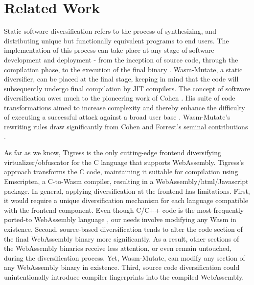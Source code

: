 \documentclass[a4paper,fleqn]{cas-dc}
\newcommand*\badge[1]{ \colorbox{red}{\color{white}#1}}
\newcommand{\tool}{{\sc Wasm-Mutate}\xspace}
\newcommand{\Wasm}{WebAssembly\xspace}
\newenvironment{revision1}{\color{blue}}{}
\newcommand{\todo}[1]{%
\refstepcounter{todo}
\noindent\textbf{\badge{TODO}} {\color{red}#1}
\addcontentsline{td}{todo}
{\color{red}\thesection.\thetodo\xspace #1}}
\begin{document}
\section{Related Work}
\label{rw}


Static software diversification refers to the process of synthesizing, and distributing unique but functionally equivalent programs to end users. 
The implementation of this process can take place at any stage of software development and deployment - from the inception of source code, through the compilation phase, to the execution of the final binary \cite{jackson2011compiler, lundquist2016searching}.
\tool, a static diversifier, can be placed at the final stage, keeping in mind that the code will subsequently undergo final compilation by JIT compilers.
The concept of software diversification owes much to the pioneering work of Cohen \cite{cohen1993operating}. 
His suite of code transformations aimed to increase complexity and thereby enhance the difficulty of executing a successful attack against a broad user base \cite{cohen1993operating}. 
\tool's rewriting rules draw significantly from Cohen and Forrest's seminal contributions \cite{cohen1993operating, 595185}.

\begin{revision1}
As far as we know, Tigress is the only cutting-edge frontend diversifying virtualizer/obfuscator for the C language that supports \Wasm \cite{10.1145/3176258}.
Tigress's approach transforms the C code, maintaining it suitable for compilation using Emscripten, a C-to-Wasm compiler, resulting in a WebAssembly/html/Javascript package.
In general, applying diversification at the frontend has limitations. 
First, it would require a unique diversification mechanism for each language compatible with the frontend component.
Even though C/C++ code is the most frequently ported-to \Wasm language \cite{hilbig2021empirical}, our needs involve modifying any Wasm in existence.
Second, source-based diversification tends to alter the code section of the final \Wasm binary more significantly.
As a result, other sections of the \Wasm binaries receive less attention, or even remain untouched, during the diversification process.
Yet, \tool, can modify any section of any \Wasm binary in existence.
Third, source code diversification could unintentionally introduce compiler fingerprints into the compiled \Wasm \cite{CABRERAARTEAGA2023103296}.

\end{revision1}
\end{document}
